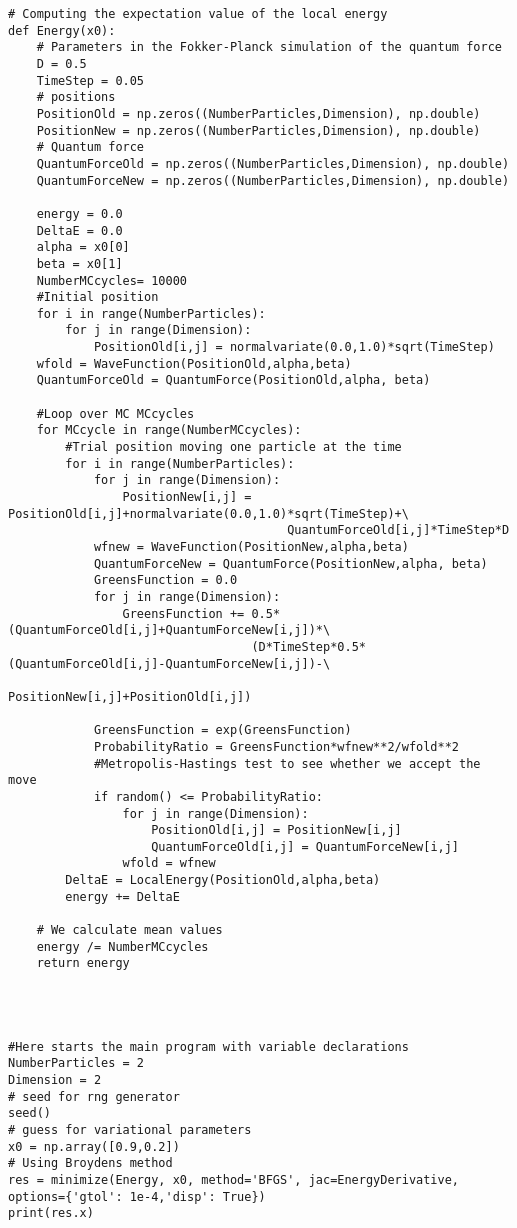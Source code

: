 \documentclass[%
oneside,                 %
final,                   %
10pt]{article}
\begin{document}
\begin{verbatim}
# Computing the expectation value of the local energy 
def Energy(x0):
    # Parameters in the Fokker-Planck simulation of the quantum force
    D = 0.5
    TimeStep = 0.05
    # positions
    PositionOld = np.zeros((NumberParticles,Dimension), np.double)
    PositionNew = np.zeros((NumberParticles,Dimension), np.double)
    # Quantum force
    QuantumForceOld = np.zeros((NumberParticles,Dimension), np.double)
    QuantumForceNew = np.zeros((NumberParticles,Dimension), np.double)

    energy = 0.0
    DeltaE = 0.0
    alpha = x0[0]
    beta = x0[1]
    NumberMCcycles= 10000
    #Initial position
    for i in range(NumberParticles):
        for j in range(Dimension):
            PositionOld[i,j] = normalvariate(0.0,1.0)*sqrt(TimeStep)
    wfold = WaveFunction(PositionOld,alpha,beta)
    QuantumForceOld = QuantumForce(PositionOld,alpha, beta)

    #Loop over MC MCcycles
    for MCcycle in range(NumberMCcycles):
        #Trial position moving one particle at the time
        for i in range(NumberParticles):
            for j in range(Dimension):
                PositionNew[i,j] = PositionOld[i,j]+normalvariate(0.0,1.0)*sqrt(TimeStep)+\
                                       QuantumForceOld[i,j]*TimeStep*D
            wfnew = WaveFunction(PositionNew,alpha,beta)
            QuantumForceNew = QuantumForce(PositionNew,alpha, beta)
            GreensFunction = 0.0
            for j in range(Dimension):
                GreensFunction += 0.5*(QuantumForceOld[i,j]+QuantumForceNew[i,j])*\
	                              (D*TimeStep*0.5*(QuantumForceOld[i,j]-QuantumForceNew[i,j])-\
                                      PositionNew[i,j]+PositionOld[i,j])
      
            GreensFunction = exp(GreensFunction)
            ProbabilityRatio = GreensFunction*wfnew**2/wfold**2
            #Metropolis-Hastings test to see whether we accept the move
            if random() <= ProbabilityRatio:
                for j in range(Dimension):
                    PositionOld[i,j] = PositionNew[i,j]
                    QuantumForceOld[i,j] = QuantumForceNew[i,j]
                wfold = wfnew
        DeltaE = LocalEnergy(PositionOld,alpha,beta)
        energy += DeltaE
            
    # We calculate mean values
    energy /= NumberMCcycles
    return energy




#Here starts the main program with variable declarations
NumberParticles = 2
Dimension = 2
# seed for rng generator 
seed()
# guess for variational parameters
x0 = np.array([0.9,0.2])
# Using Broydens method
res = minimize(Energy, x0, method='BFGS', jac=EnergyDerivative, options={'gtol': 1e-4,'disp': True})
print(res.x)

\end{verbatim}
\end{document}
